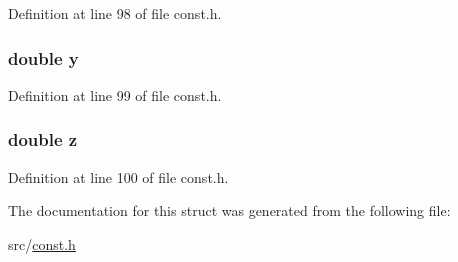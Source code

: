 Definition at line 98 of file const.\+h.

\hypertarget{structparticle_ab927965981178aa1fba979a37168db2a}{}
\subsubsection[{y}]{\setlength{\rightskip}{0pt plus 5cm}double y}\label{structparticle_ab927965981178aa1fba979a37168db2a}


Definition at line 99 of file const.\+h.

\hypertarget{structparticle_ab3e6ed577a7c669c19de1f9c1b46c872}{}
\subsubsection[{z}]{\setlength{\rightskip}{0pt plus 5cm}double z}\label{structparticle_ab3e6ed577a7c669c19de1f9c1b46c872}


Definition at line 100 of file const.\+h.



The documentation for this struct was generated from the following file\+:\begin{DoxyCompactItemize}
\item 
src/\hyperlink{const_8h}{const.\+h}\end{DoxyCompactItemize}

